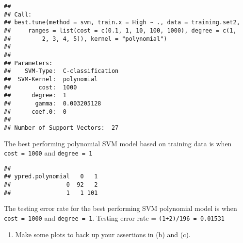 \documentclass[]{article}
\newenvironment{Shaded}{\begin{snugshade}}{\end{snugshade}}
\newcommand{\KeywordTok}[1]{\textcolor[rgb]{0.13,0.29,0.53}{\textbf{#1}}}
\newcommand{\DataTypeTok}[1]{\textcolor[rgb]{0.13,0.29,0.53}{#1}}
\newcommand{\DecValTok}[1]{\textcolor[rgb]{0.00,0.00,0.81}{#1}}
\newcommand{\StringTok}[1]{\textcolor[rgb]{0.31,0.60,0.02}{#1}}
\newcommand{\CommentTok}[1]{\textcolor[rgb]{0.56,0.35,0.01}{\textit{#1}}}
\newcommand{\OperatorTok}[1]{\textcolor[rgb]{0.81,0.36,0.00}{\textbf{#1}}}
\newcommand{\NormalTok}[1]{#1}
\providecommand{\tightlist}{%
  \setlength{\itemsep}{0pt}\setlength{\parskip}{0pt}}
\begin{document}
\begin{Shaded}
\end{Shaded}

\begin{verbatim}
## 
## Call:
## best.tune(method = svm, train.x = High ~ ., data = training.set2, 
##     ranges = list(cost = c(0.1, 1, 10, 100, 1000), degree = c(1, 
##         2, 3, 4, 5)), kernel = "polynomial")
## 
## 
## Parameters:
##    SVM-Type:  C-classification 
##  SVM-Kernel:  polynomial 
##        cost:  1000 
##      degree:  1 
##       gamma:  0.003205128 
##      coef.0:  0 
## 
## Number of Support Vectors:  27
\end{verbatim}

The best performing polynomial SVM model based on training data is when
\texttt{cost\ =\ 1000} and \texttt{degree\ =\ 1}

\begin{Shaded}
\end{Shaded}

\begin{verbatim}
##                 
## ypred.polynomial   0   1
##                0  92   2
##                1   1 101
\end{verbatim}

The testing error rate for the best performing SVM polynomial model is
when \texttt{cost\ =\ 1000} and \texttt{degree\ =\ 1}. Testing error
rate = \texttt{(1+2)/196\ =\ 0.01531}

\begin{enumerate}
\def\labelenumi{(\alph{enumi})}
\setcounter{enumi}{3}
\tightlist
\item
  Make some plots to back up your assertions in (b) and (c).
\end{enumerate}
\end{document}
